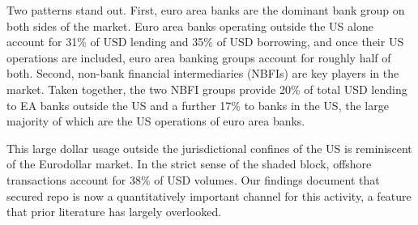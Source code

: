 \documentclass[english, 12pt, oneside]{article}
\begin{document}
Two patterns stand out. First, euro area banks are the dominant bank group on both sides of the market. Euro area banks operating outside the US alone account for 31\% of USD lending and 35\% of USD borrowing, and once their US operations are included, euro area banking groups account for roughly half of both. Second, non-bank financial intermediaries (NBFIs) are key players in the market. Taken together, the two NBFI groups provide 20\% of total USD lending to EA banks outside the US and a further 17\% to banks in the US, the large majority of which are the US operations of euro area banks.

This large dollar usage outside the jurisdictional confines of the US is reminiscent of the Eurodollar market. In the strict sense of the shaded block, offshore transactions account for 38\% of USD volumes. Our findings document that secured repo is now a quantitatively important channel for this activity, a feature that prior literature has largely overlooked.
\end{document}
